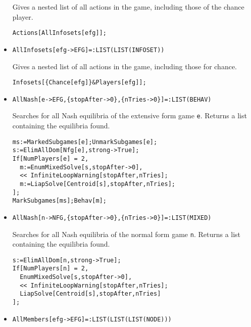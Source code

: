\begin{itemize}
\bd 
Gives a nested list of all actions in the game, including those of
the chance player.  
\begin{verbatim}
Actions[AllInfosets[efg]];
\end{verbatim} 
\ed

\item{}
\protect \large \begin{verbatim}
AllInfosets[efg->EFG]=:LIST(LIST(INFOSET))
\end{verbatim}\normalsize

\bd 
Gives a nested list of all actions in the game, including those for
chance. 
\begin{verbatim}
Infosets[{Chance[efg]}&Players[efg]];
\end{verbatim} 
\ed

\item{}
\protect \large \begin{verbatim}
AllNash[e->EFG,{stopAfter->0},{nTries->0}]=:LIST(BEHAV)
\end{verbatim}\normalsize

\bd 
Searches for all Nash equilibria of the extensive form game
\verb+e+.  Returns a list containing the equilibria found.

\begin{verbatim}
ms:=MarkedSubgames[e];UnmarkSubgames[e];
s:=ElimAllDom[Nfg[e],strong->True];
If[NumPlayers[e] = 2, 
  m:=EnumMixedSolve[s,stopAfter->0],
  << InfiniteLoopWarning[stopAfter,nTries];
  m:=LiapSolve[Centroid[s],stopAfter,nTries];
];
MarkSubgames[ms];Behav[m];
\end{verbatim} 
\ed

\item{}
\protect \large \begin{verbatim}
AllNash[n->NFG,{stopAfter->0},{nTries->0}]=:LIST(MIXED)
\end{verbatim}\normalsize

\bd 
Searches for all Nash equilibria of the normal form game
\verb+n+.  Returns a list containing the equilibria found.

\begin{verbatim}
s:=ElimAllDom[n,strong->True];
If[NumPlayers[n] = 2, 
  EnumMixedSolve[s,stopAfter->0],
  << InfiniteLoopWarning[stopAfter,nTries];
  LiapSolve[Centroid[s],stopAfter,nTries]
];
\end{verbatim} 
\ed

\item{}
\protect \large \begin{verbatim}
AllMembers[efg->EFG]=:LIST(LIST(LIST(NODE)))
\end{verbatim}\normalsize


\end{itemize}
